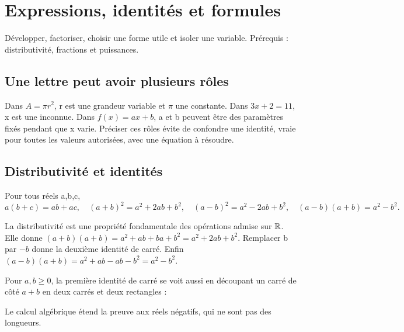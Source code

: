 \documentclass[../cours_2de.tex]{subfiles}
\begin{document}
\setcounter{chapter}{4}
\chapter{Expressions, identités et formules}
\label{sec:ch05}
\begin{objectif}
Développer, factoriser, choisir une forme utile et isoler une variable. Prérequis : distributivité, fractions et puissances.
\end{objectif}
\section{Une lettre peut avoir plusieurs rôles}
Dans $A=\pi r^2$, r est une grandeur variable et $\pi$ une constante. Dans $3x+2=11$, x est une inconnue. Dans $f(x)=ax+b$, a et b peuvent être des paramètres fixés pendant que x varie. Préciser ces rôles évite de confondre une identité, vraie pour toutes les valeurs autorisées, avec une équation à résoudre.
\section{Distributivité et identités}
\begin{propriete}
Pour tous réels a,b,c,
\[
a(b+c)=ab+ac,\quad
(a+b)^2=a^2+2ab+b^2,\quad
(a-b)^2=a^2-2ab+b^2,\quad
(a-b)(a+b)=a^2-b^2.
\]
\end{propriete}
\begin{demonstration}
La distributivité est une propriété fondamentale des opérations admise sur $\mathbb{R}$. Elle donne
$(a+b)(a+b)=a^2+ab+ba+b^2=a^2+2ab+b^2$.
Remplacer b par $-b$ donne la deuxième identité de carré. Enfin
$(a-b)(a+b)=a^2+ab-ab-b^2=a^2-b^2$.
\end{demonstration}
Pour $a,b\ge0$, la première identité de carré se voit aussi en découpant un carré de côté $a+b$ en deux carrés et deux rectangles :
\begin{center}
\end{center}
Le calcul algébrique étend la preuve aux réels négatifs, qui ne sont pas des longueurs.
\end{document}
